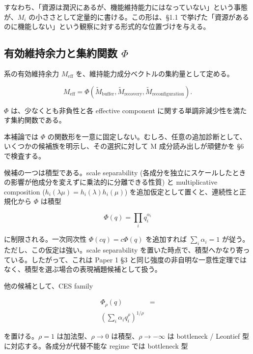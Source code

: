 \documentclass[12pt,a4paper]{article}
\begin{document}
すなわち、「資源は潤沢にあるが、機能維持能力にはなっていない」という事態が、\(M_i\) の小ささとして定量的に書ける。この形は、§1.1 で挙げた「資源があるのに機能しない」という観察に対する形式的な位置づけを与える。

\subsection{\texorpdfstring{有効維持余力と集約関数 \(\Phi\)}{有効維持余力と集約関数 \textbackslash Phi}}\label{ux6709ux52b9ux7dadux6301ux4f59ux529bux3068ux96c6ux7d04ux95a2ux6570-phi}

系の有効維持余力 \(M_{\mathrm{eff}}\) を、維持能力成分ベクトルの集約量として定める。

\begin{definition}[有効維持余力]

$$
M_{\mathrm{eff}} = \Phi(\widetilde M_{\mathrm{buffer}}, \widetilde M_{\mathrm{recovery}}, \widetilde M_{\mathrm{reconfiguration}}).
$$

$\Phi$ は、少なくとも非負性と各 effective component に関する単調非減少性を満たす集約関数である。
\end{definition}

本補論では \(\Phi\) の関数形を一意に固定しない。むしろ、任意の追加診断として、いくつかの候補族を明示し、その選択に対して M 成分読み出しが頑健かを §6 で検査する。

候補の一つは積型である。scale separability (各成分を独立にスケールしたときの影響が他成分を変えずに乗法的に分離できる性質) と multiplicative composition (\(h_i(\lambda\mu) = h_i(\lambda) h_i(\mu)\)) を追加仮定として置くと、連続性と正規化から \(\Phi\) は積型

\[
\Phi(q) = \prod_{i} q_{i}^{\alpha_{i}}
\]

に制限される。一次同次性 \(\Phi(cq) = c \Phi(q)\) を追加すれば \(\sum_i \alpha_i = 1\) が従う。ただし、この仮定は強い。scale separability を置いた時点で、積型へかなり寄っている。したがって、これは Paper 1 §3 と同じ強度の非自明な一意性定理ではなく、積型を選ぶ場合の表現補題候補として扱う。

他の候補として、CES family

\[
\begin{aligned}
\Phi_\rho(q) &= \\
\left(\sum_{i} \alpha_{i} q_{i}^\rho \right)^{1/\rho}
\end{aligned}
\]

を置ける。\(\rho=1\) は加法型、\(\rho \to 0\) は積型、\(\rho \to -\infty\) は bottleneck / Leontief 型に対応する。各成分が代替不能な regime では bottleneck 型
\end{document}
